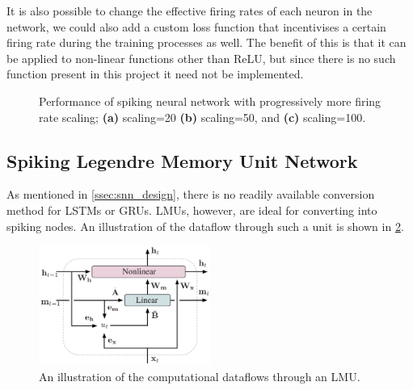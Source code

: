 It is also possible to change the effective firing rates of each neuron in the network, we could also add a custom loss function that incentivises a certain firing rate during the training processes as well. The benefit of this is that it can be applied to non-linear functions other than ReLU, but since there is no such function present in this project it need not be implemented.

\begin{figure}[htb]%
    \centering
    \qquad
    \qquad
    \caption{Performance of spiking neural network with progressively more firing rate scaling; \textbf{(a)} scaling=20 \textbf{(b)} scaling=50, and \textbf{(c)} scaling=100.}%
    \label{fig:post_firing_rate_scaling}%
\end{figure}

\subsection{Spiking Legendre Memory Unit Network}

As mentioned in \cref{ssec:snn_design}, there is no readily available conversion method for LSTMs or GRUs. LMUs, however, are ideal for converting into spiking nodes. An illustration of the dataflow through such a unit is shown in \cref{fig:lmu_computational_graph}.

\begin{figure}[htb]%
    \centering
    \includegraphics[width=0.5\textwidth]{implementation/images/lmu_computational_graph.png}
    \caption{An illustration of the computational dataflows through an LMU\cite{LMU}.}%
    \label{fig:lmu_computational_graph}%
\end{figure}


